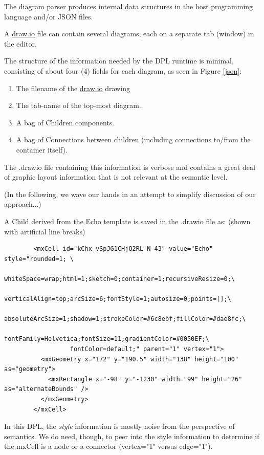 \documentclass[10pt,anonymous,review]{acmart}
\begin{document}
The diagram parser produces internal data structures in the host programming language and/or JSON\cite{json} files.

A \href{http://draw.io}{draw.io} file can contain several diagrams, each on a separate tab (window) in the editor.

The structure of the information needed by the DPL runtime is minimal, consisting of about four (4) fields for each diagram, as seen in Figure \ref{json}:

\begin{enumerate}
\item The filename of the \href{http://draw.io}{draw.io} drawing

\item The tab-name of the top-most diagram.

\item A bag of Children components.

\item A bag of Connections between children (including connections to/from the container itself).

\end{enumerate}

The .drawio file containing this information is verbose and contains a great deal of graphic layout information that is not relevant at the semantic level.

(In the following, we wave our hands in an attempt to simplify discussion of our approach...)

A Child derived from the Echo template is saved in the .drawio file as: (shown with artificial line breaks)
\begin{verbatim}
        <mxCell id="kChx-vSpJG1CHjQ2RL-N-43" value="Echo" style="rounded=1; \
                  whiteSpace=wrap;html=1;sketch=0;container=1;recursiveResize=0;\
                  verticalAlign=top;arcSize=6;fontStyle=1;autosize=0;points=[];\
                  absoluteArcSize=1;shadow=1;strokeColor=#6c8ebf;fillColor=#dae8fc;\
                  fontFamily=Helvetica;fontSize=11;gradientColor=#0050EF;\
                  fontColor=default;" parent="1" vertex="1">
          <mxGeometry x="172" y="190.5" width="138" height="100" as="geometry">
            <mxRectangle x="-98" y="-1230" width="99" height="26" as="alternateBounds" />
          </mxGeometry>
        </mxCell>
\end{verbatim}

In this DPL, the \emph{style} information is mostly noise from the perspective of semantics. We do need, though, to peer into the style information to determine if the mxCell is a node or a connector (vertex="1" versus edge="1").
\end{document}
